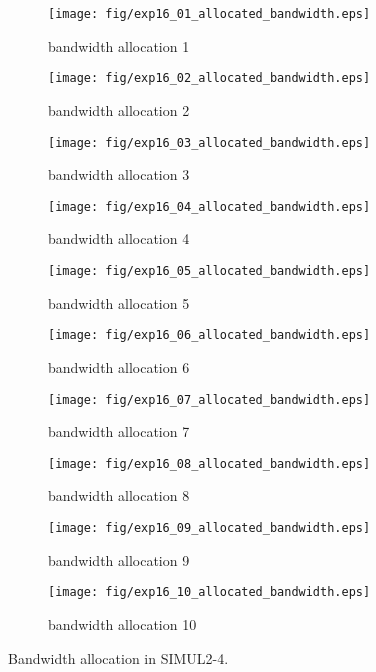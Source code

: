 	\begin{figure}
		\begin{center}
			\begin{subfigure}[b]{0.32\textwidth}
				\texttt{[image: fig/exp16\_01\_allocated\_bandwidth.eps]}
				\caption{bandwidth allocation 1}
				\label{figure:simul2_4_b_a}
			\end{subfigure}
			\begin{subfigure}[b]{0.32\textwidth}
				\texttt{[image: fig/exp16\_02\_allocated\_bandwidth.eps]}
				\caption{bandwidth allocation 2}
				\label{figure:simul2_4_b_b}
			\end{subfigure}
			\begin{subfigure}[b]{0.32\textwidth}
				\texttt{[image: fig/exp16\_03\_allocated\_bandwidth.eps]}
				\caption{bandwidth allocation 3}
				\label{figure:simul2_4_b_c}
			\end{subfigure}
			\begin{subfigure}[b]{0.32\textwidth}
				\texttt{[image: fig/exp16\_04\_allocated\_bandwidth.eps]}
				\caption{bandwidth allocation 4}
				\label{figure:simul2_4_b_d}
			\end{subfigure}
			\begin{subfigure}[b]{0.32\textwidth}
				\texttt{[image: fig/exp16\_05\_allocated\_bandwidth.eps]}
				\caption{bandwidth allocation 5}
				\label{figure:simul2_4_b_e}
			\end{subfigure}
			\begin{subfigure}[b]{0.32\textwidth}
				\texttt{[image: fig/exp16\_06\_allocated\_bandwidth.eps]}
				\caption{bandwidth allocation 6}
				\label{figure:simul2_4_b_f}
			\end{subfigure}
			\begin{subfigure}[b]{0.32\textwidth}
				\texttt{[image: fig/exp16\_07\_allocated\_bandwidth.eps]}
				\caption{bandwidth allocation 7}
				\label{figure:simul2_4_b_g}
			\end{subfigure}
			\begin{subfigure}[b]{0.32\textwidth}
				\texttt{[image: fig/exp16\_08\_allocated\_bandwidth.eps]}
				\caption{bandwidth allocation 8}
				\label{figure:simul2_4_b_h}
			\end{subfigure}
			\begin{subfigure}[b]{0.32\textwidth}
				\texttt{[image: fig/exp16\_09\_allocated\_bandwidth.eps]}
				\caption{bandwidth allocation 9}
				\label{figure:simul2_4_b_i}
			\end{subfigure}
			\begin{subfigure}[b]{0.32\textwidth}
				\texttt{[image: fig/exp16\_10\_allocated\_bandwidth.eps]}
				\caption{bandwidth allocation 10}
				\label{figure:simul2_4_b_j}
			\end{subfigure}
			\caption{Bandwidth allocation in SIMUL2-4.}
			\label{figure:simul2_4_ba}
		\end{center}
	\end{figure}


